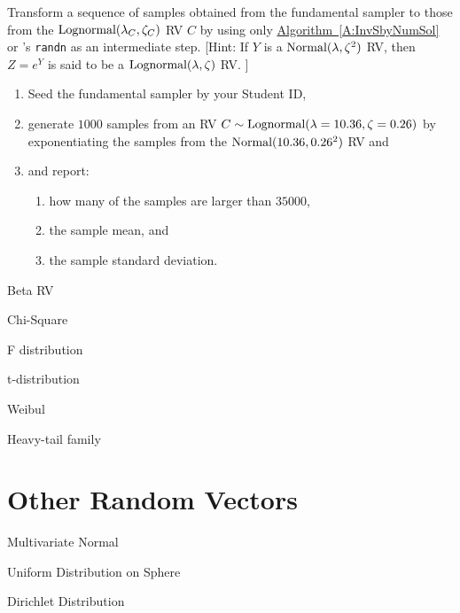 \begin{labwork}\label{LW:lognormal}
Transform a sequence of samples obtained from the fundamental sampler to those from the $\mbox{{\rm Lognormal}}(\lambda_C,\zeta_C)$ RV $C$ by using only  \hyperref[A:InvSbyNumSol]{Algorithm~\ref*{A:InvSbyNumSol}} or \Matlab's {\tt randn} as an intermediate step.   [Hint: %
If $Y$ is a $\mbox{{\rm Normal}}(\lambda,\zeta^2)$ RV, then $Z=e^Y$ is said to be a $\mbox{{\rm Lognormal}}(\lambda,\zeta)$ RV.  ]
\begin{enumerate}
\item Seed the fundamental sampler by your Student ID,
\item generate $1000$ samples from an RV $C\sim \mbox{{\rm Lognormal}}(\lambda=10.36, \zeta=0.26)$ by exponentiating the samples from the $\mbox{{\rm Normal}}(10.36,0.26^2)$ RV and
\item and report:
\begin{enumerate}
\item how many of the samples are larger than $35000$,
\item the sample mean, and
\item the sample standard deviation.
\end{enumerate}
\end{enumerate}

\end{labwork}

Beta RV

Chi-Square

F distribution

t-distribution

Weibul

Heavy-tail family

\section{Other Random Vectors}\label{S:OtherRVecs}

Multivariate Normal

Uniform Distribution on Sphere

Dirichlet Distribution



